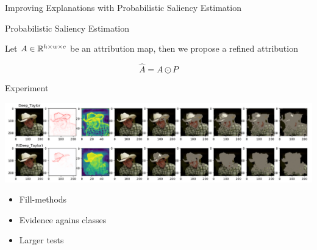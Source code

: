 \begin{frame}[standout]
	Improving Explanations with Probabilistic Saliency Estimation
\end{frame}

\begin{frame}{Probabilistic Saliency Estimation~\cite{pse}}
	\begin{center}
		\scalebox{0.55}{
			
		}
	\end{center}
	
	Let $A \in \mathbb{R}^{h \times w \times c}$ be an attribution map,
	then we propose a refined attribution 

	$$
		\hat A = A \odot P
	$$
\end{frame}

\begin{frame}{Experiment}
	\begin{center} 
	\includegraphics[width=\textwidth]{PSE_example.png}
	\end{center}
	\begin{itemize}
		\item Fill-methods
		\item Evidence agains classes
		\item Larger tests
	\end{itemize}
\end{frame}

